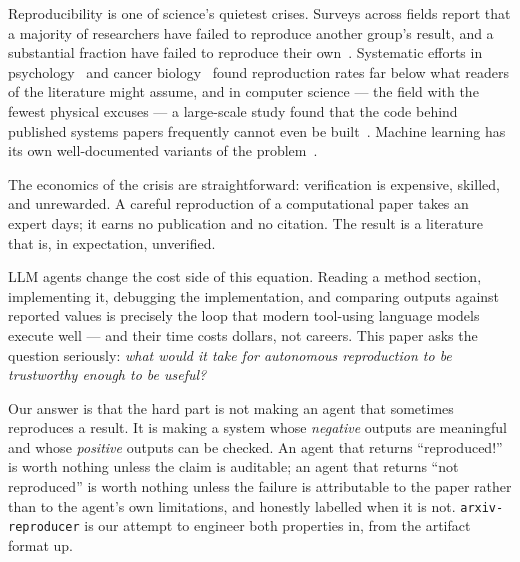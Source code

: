 \documentclass[10pt]{article}
\newcommand{\system}{\texttt{arxiv-reproducer}}
\begin{document}
Reproducibility is one of science's quietest crises. Surveys across fields report that a majority of researchers have failed to reproduce another group's result, and a substantial fraction have failed to reproduce their own~\cite{baker2016}. Systematic efforts in psychology~\cite{osc2015} and cancer biology~\cite{errington2021} found reproduction rates far below what readers of the literature might assume, and in computer science --- the field with the fewest physical excuses --- a large-scale study found that the code behind published systems papers frequently cannot even be built~\cite{collberg2016}. Machine learning has its own well-documented variants of the problem~\cite{gundersen2018,pineau2021,kapoor2023}.

The economics of the crisis are straightforward: verification is expensive, skilled, and unrewarded. A careful reproduction of a computational paper takes an expert days; it earns no publication and no citation. The result is a literature that is, in expectation, unverified.

LLM agents change the cost side of this equation. Reading a method section, implementing it, debugging the implementation, and comparing outputs against reported values is precisely the loop that modern tool-using language models execute well --- and their time costs dollars, not careers. This paper asks the question seriously: \emph{what would it take for autonomous reproduction to be trustworthy enough to be useful?}

Our answer is that the hard part is not making an agent that sometimes reproduces a result. It is making a system whose \emph{negative} outputs are meaningful and whose \emph{positive} outputs can be checked. An agent that returns ``reproduced!'' is worth nothing unless the claim is auditable; an agent that returns ``not reproduced'' is worth nothing unless the failure is attributable to the paper rather than to the agent's own limitations, and honestly labelled when it is not. \system{} is our attempt to engineer both properties in, from the artifact format up.
\end{document}
